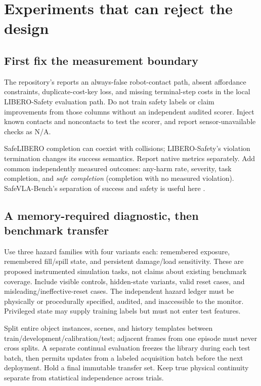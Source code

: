 \documentclass[10pt]{article}
\newcommand{\code}[1]{\texttt{\detokenize{#1}}}
\begin{document}
\section{Experiments that can reject the design}
\subsection{First fix the measurement boundary}
The repository's \code{docs/code_review_findings.md} reports an always-false robot-contact path, absent affordance constraints, duplicate-cost-key loss, and missing terminal-step costs in the local LIBERO-Safety evaluation path. Do not train safety labels or claim improvements from those columns without an independent audited scorer. Inject known contacts and noncontacts to test the scorer, and report sensor-unavailable checks as N/A.

SafeLIBERO completion can coexist with collisions; LIBERO-Safety's violation termination changes its success semantics. Report native metrics separately. Add common independently measured outcomes: any-harm rate, severity, task completion, and \emph{safe completion} (completion with no measured violation). SafeVLA-Bench's separation of success and safety is useful here \cite{safebench}.

\subsection{A memory-required diagnostic, then benchmark transfer}
Use three hazard families with four variants each: remembered exposure, remembered fill/spill state, and persistent damage/load sensitivity. These are proposed instrumented simulation tasks, not claims about existing benchmark coverage. Include visible controls, hidden-state variants, valid reset cases, and misleading/ineffective-reset cases. The independent hazard ledger must be physically or procedurally specified, audited, and inaccessible to the monitor. Privileged state may supply training labels but must not enter test features.

Split entire object instances, scenes, and history templates between train/development/calibration/test; adjacent frames from one episode must never cross splits. A separate continual evaluation freezes the library during each test batch, then permits updates from a labeled acquisition batch before the next deployment. Hold a final immutable transfer set. Keep true physical continuity separate from statistical independence across trials.
\end{document}
